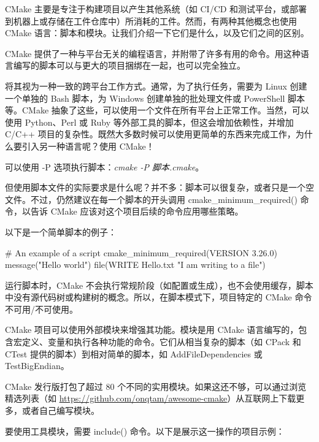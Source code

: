 CMake 主要是专注于构建项目以产生其他系统（如 CI/CD 和测试平台，或部署到机器上或存储在工件仓库中）所消耗的工件。然而，有两种其他概念也使用 CMake 语言：脚本和模块。让我们介绍一下它们是什么，以及它们之间的区别。



CMake 提供了一种与平台无关的编程语言，并附带了许多有用的命令。用这种语言编写的脚本可以与更大的项目捆绑在一起，也可以完全独立。

将其视为一种一致的跨平台工作方式。通常，为了执行任务，需要为 Linux 创建一个单独的 Bash 脚本，为 Windows 创建单独的批处理文件或 PowerShell 脚本等。CMake 抽象了这些，可以使用一个文件在所有平台上正常工作。当然，可以使用 Python、Perl 或 Ruby 等外部工具的脚本，但这会增加依赖性，并增加 C/C++ 项目的复杂性。既然大多数时候可以使用更简单的东西来完成工作，为什么要引入另一种语言呢？使用 CMake！

可以使用 -P 选项执行脚本：\textit{cmake -P 脚本.cmake}。

但使用脚本文件的实际要求是什么呢？并不多：脚本可以很复杂，或者只是一个空文件。不过，仍然建议在每一个脚本的开头调用 cmake\_minimum\_required() 命令，以告诉 CMake 应该对这个项目后续的命令应用哪些策略。

以下是一个简单脚本的例子：


\begin{cmake}
# An example of a script
cmake_minimum_required(VERSION 3.26.0)
message("Hello world")
file(WRITE Hello.txt "I am writing to a file")
\end{cmake}

运行脚本时，CMake 不会执行常规阶段（如配置或生成），也不会使用缓存，脚本中没有源代码树或构建树的概念。所以，在脚本模式下，项目特定的 CMake 命令不可用/不可使用。


CMake 项目可以使用外部模块来增强其功能。模块是用 CMake 语言编写的，包含宏定义、变量和执行各种功能的命令。它们从相当复杂的脚本（如 CPack 和 CTest 提供的脚本）到相对简单的脚本，如 AddFileDependencies 或 TestBigEndian。

CMake 发行版打包了超过 80 个不同的实用模块。如果这还不够，可以通过浏览精选列表（如 \url{https://github.com/onqtam/awesome-cmake}）从互联网上下载更多，或者自己编写模块。

要使用工具模块，需要 include() 命令。以下是展示这一操作的项目示例：


